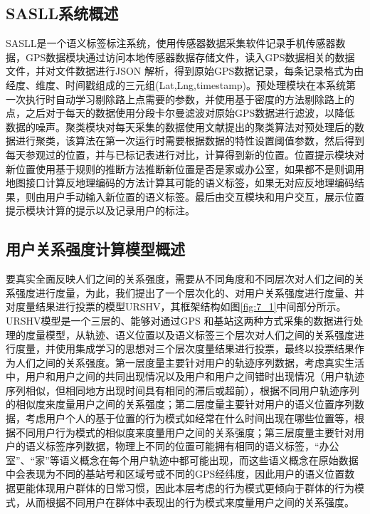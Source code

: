 \subsection{SASLL系统概述}
SASLL是一个语义标签标注系统，使用传感器数据采集软件记录手机传感器数据，GPS数据模块通过访问本地传感器数据存储文件，读入GPS数据相关的数据文件，并对文件数据进行JSON 解析，得到原始GPS数据记录，每条记录格式为由经度、维度、时间戳组成的三元组(Lat,Lng,timestamp)。预处理模块在本系统第一次执行时自动学习剔除路上点需要的参数，并使用基于密度的方法剔除路上的点，之后对于每天的数据使用分段卡尔曼滤波对原始GPS数据进行滤波，以降低数据的噪声。聚类模块对每天采集的数据使用文献\cite{rodriguez2014clustering}提出的聚类算法对预处理后的数据进行聚类，该算法在第一次运行时需要根据数据的特性设置阈值参数，然后得到每天参观过的位置，并与已标记表进行对比，计算得到新的位置。位置提示模块对新位置使用基于规则的推断方法推断新位置是否是家或办公室，如果都不是则调用地图接口计算反地理编码的方法计算其可能的语义标签，如果无对应反地理编码结果，则由用户手动输入新位置的语义标签。最后由交互模块和用户交互，展示位置提示模块计算的提示以及记录用户的标注。
\subsection{用户关系强度计算模型概述}
要真实全面反映人们之间的关系强度，需要从不同角度和不同层次对人们之间的关系强度进行度量，为此，我们提出了一个层次化的、对用户关系强度进行度量、并对度量结果进行投票的模型URSHV，其框架结构如图\ref{fig:7_1}中间部分所示。URSHV模型是一个三层的、能够对通过GPS 和基站这两种方式采集的数据进行处理的度量模型，从轨迹、语义位置以及语义标签三个层次对人们之间的关系强度进行度量，并使用集成学习的思想对三个层次度量结果进行投票，最终以投票结果作为人们之间的关系强度。第一层度量主要针对用户的轨迹序列数据，考虑真实生活中，用户和用户之间的共同出现情况以及用户和用户之间错时出现情况（用户轨迹序列相似，但相同地方出现时间具有相同的滞后或超前），根据不同用户轨迹序列的相似度来度量用户之间的关系强度；第二层度量主要针对用户的语义位置序列数据，考虑用户个人的基于位置的行为模式如经常在什么时间出现在哪些位置等，根据不同用户行为模式的相似度来度量用户之间的关系强度；第三层度量主要针对用户的语义标签序列数据，物理上不同的位置可能拥有相同的语义标签，“办公室”、“家”等语义概念在每个用户轨迹中都可能出现，而这些语义概念在原始数据中会表现为不同的基站号和区域号或不同的GPS经纬度，因此用户的语义位置数据更能体现用户群体的日常习惯，因此本层考虑的行为模式更倾向于群体的行为模式，从而根据不同用户在群体中表现出的行为模式来度量用户之间的关系强度。
